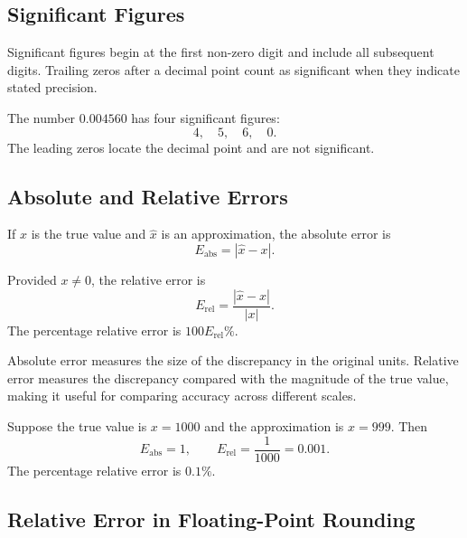 \subsection{Significant Figures}

\begin{definition}
  Significant figures begin at the first non-zero digit and include all subsequent digits. Trailing zeros after a decimal point count as significant when they indicate stated precision.
\end{definition}

\begin{example}
  The number \(0.004560\) has four significant figures:
  \[
    4,\quad5,\quad6,\quad0.
  \]
  The leading zeros locate the decimal point and are not significant.
\end{example}

\subsection{Absolute and Relative Errors}

\begin{definition}
  If \(x\) is the true value and \(\hat{x}\) is an approximation, the absolute error is
  \[
    \boxed{E_{\mathrm{abs}}=|\hat{x}-x|.}
  \]
\end{definition}

\begin{definition}
  Provided \(x\neq0\), the relative error is
  \[
    \boxed{
      E_{\mathrm{rel}}=\frac{|\hat{x}-x|}{|x|}.
    }
  \]
  The percentage relative error is \(100E_{\mathrm{rel}}\%\).
\end{definition}

\begin{remark}
  Absolute error measures the size of the discrepancy in the original units. Relative error measures the discrepancy compared with the magnitude of the true value, making it useful for comparing accuracy across different scales.
\end{remark}

\begin{example}
  Suppose the true value is \(x=1000\) and the approximation is \(\hat{x}=999\). Then
  \[
    E_{\mathrm{abs}}=1,
    \qquad
    E_{\mathrm{rel}}=\frac{1}{1000}=0.001.
  \]
  The percentage relative error is \(0.1\%\).
\end{example}

\subsection{Relative Error in Floating-Point Rounding}

